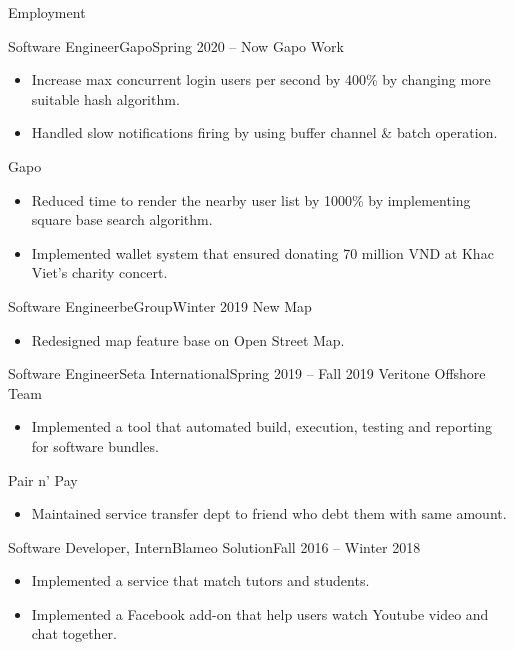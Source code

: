 \documentclass[]{mcdowellcv}
\begin{document}
	\makeheader
	
	\begin{cvsection}{Employment}
		\begin{cvsubsection}{Software Engineer}{Gapo}{Spring 2020 -- Now}	
			Gapo Work 		
			\begin{itemize}
				\item Increase max concurrent login users per second by 400\% by changing more suitable hash algorithm.
				\item Handled slow notifications firing by using buffer channel \& batch operation.
			\end{itemize}
			Gapo 		
			\begin{itemize}
				\item Reduced time to render the nearby user list by 1000\% by implementing square base search algorithm.
				\item Implemented wallet system that ensured donating 70 million VND at Khac Viet's charity concert.
			\end{itemize}
		\end{cvsubsection}
		
		\begin{cvsubsection}{Software Engineer}{beGroup}{Winter 2019}
			New Map	
			\begin{itemize}
				\item Redesigned map feature base on Open Street Map.
			\end{itemize}
		\end{cvsubsection}

		\begin{cvsubsection}{Software Engineer}{Seta International}{Spring 2019 -- Fall 2019}
			Veritone Offshore Team	
			\begin{itemize}
				\item Implemented a tool that automated build, execution, testing and reporting for software bundles.
			\end{itemize}
			Pair n' Pay	
			\begin{itemize}
				\item Maintained service transfer dept to friend who debt them with same amount.
			\end{itemize}
		\end{cvsubsection}

		\begin{cvsubsection}{Software Developer, Intern}{Blameo Solution}{Fall 2016 -- Winter 2018}	
			\begin{itemize}
				\item Implemented a service that match tutors and students.
				\item Implemented a Facebook add-on that help users watch Youtube video and chat together.
				 

\end{itemize}
\end{cvsubsection}
\end{cvsection}
\end{document}
